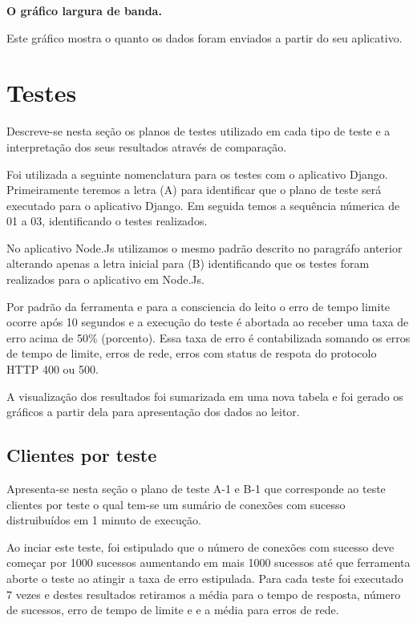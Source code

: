   \textbf{O gráfico largura de banda.}
  
  Este gráfico mostra o quanto os dados foram enviados a partir do seu aplicativo.


\section{Testes}

  Descreve-se nesta seção os planos de testes utilizado em cada tipo de teste e a interpretação dos seus resultados
  através de comparação.
  
  Foi utilizada a seguinte nomenclatura para os testes com o aplicativo Django. Primeiramente teremos a letra (A) para identificar
  que o plano de teste será executado para o aplicativo Django. Em seguida temos a sequência númerica de 01 a 03, 
  identificando o testes realizados. 
  
  No aplicativo Node.Js utilizamos o mesmo padrão descrito no paragráfo anterior alterando apenas a letra inicial para (B) identificando
  que os testes foram realizados para o aplicativo em Node.Js.
  
  Por padrão da ferramenta e para a consciencia do leito o erro de tempo limite ocorre após 10 segundos e a execução do teste é abortada
  ao receber uma taxa de erro acima de 50\% (porcento). Essa taxa de erro é contabilizada somando os erros de tempo de limite, erros de 
  rede, erros com status de respota do protocolo \ac{HTTP} 400 ou 500.
  
  A visualização dos resultados foi sumarizada em uma nova tabela e foi gerado os gráficos a partir dela para apresentação dos
  dados ao leitor.
  
\subsection{Clientes por teste}  

  
  Apresenta-se nesta seção o plano de teste A-1 e B-1 que corresponde ao teste clientes por teste o qual tem-se um sumário
  de conexões com sucesso distruibuídos em 1 minuto de execução.
  
  Ao inciar este teste, foi estipulado que o número de conexões com sucesso deve começar por 1000 sucessos aumentando
  em mais 1000 sucessos até que ferramenta aborte o teste ao atingir a taxa de erro estipulada. Para cada teste
  foi executado 7 vezes e destes resultados retiramos a média para o tempo de resposta, número de sucessos, erro de tempo de limite e
  e a média para erros de rede.
  
